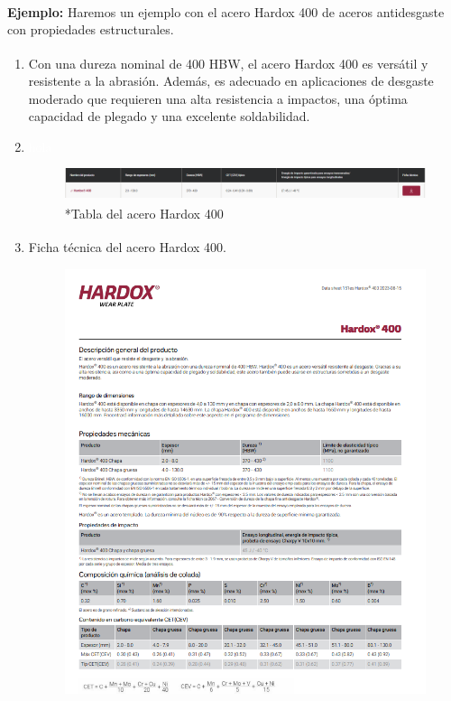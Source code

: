 \documentclass[12pt,a4paper]{article}
\begin{document}
\textbf{Ejemplo:} Haremos un ejemplo con el acero  Hardox\textsuperscript{\textregistered} 400 de aceros antidesgaste con propiedades estructurales.
\begin{enumerate}
    \item Con una dureza nominal de 400 HBW, el acero Hardox\textsuperscript{\textregistered} 400 es versátil y resistente a la abrasión. Además, es adecuado en aplicaciones de desgaste moderado que requieren una alta resistencia a impactos, una óptima capacidad de plegado y una excelente soldabilidad.
    \item \textcolor{white}{hola}\begin{figure}[h!]    
    \centering         
    \includegraphics[width=1\textwidth]{Inagenes para latex/35.png}
    \caption*{*Tabla del acero Hardox\textsuperscript{\textregistered} 400}
    \end{figure}
    \item Ficha técnica del acero Hardox\textsuperscript{\textregistered} 400.
    \begin{figure}[H]
    \centering
    \begin{minipage}{0.49\textwidth}
        \centering
        \includegraphics[width=\textwidth]{Inagenes para latex/36 izq.png}

\end{minipage}
\end{figure}
\end{enumerate}
\end{document}
